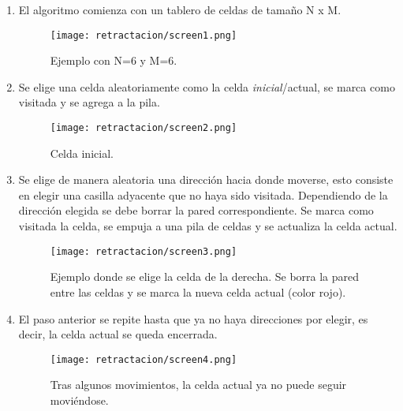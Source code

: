 \begin{enumerate}
  \item El algoritmo comienza con un tablero de celdas de tamaño N x M. 
    \begin{figure}[h!]
      \centering
      \texttt{[image: retractacion/screen1.png]}
      \caption{Ejemplo con N=6 y M=6.}
      \label{fig:tablero1}
    \end{figure}
    
  \item Se elige una celda aleatoriamente como la celda \textit{inicial}/actual, se marca como visitada y se agrega a la pila. 
    \begin{figure}[h!]
      \centering
      \texttt{[image: retractacion/screen2.png]}
      \caption{Celda inicial.}
      \label{fig:tablero2}
    \end{figure}
    
  \item Se elige de manera aleatoria una dirección hacia donde moverse, esto consiste en elegir una casilla adyacente que no haya sido visitada. Dependiendo de la dirección elegida se debe borrar la pared correspondiente. Se marca como visitada la celda, se empuja a una pila de celdas y se actualiza la celda actual. 
    \pagebreak
    \begin{figure}[h!]
      \centering
      \texttt{[image: retractacion/screen3.png]}
      \caption{Ejemplo donde se elige la celda de la derecha. Se borra la pared entre las celdas y se marca la nueva celda actual (color rojo).}
      \label{fig:tablero3}
    \end{figure}
    
  \item El paso anterior se repite hasta que ya no haya direcciones por elegir, es decir, la celda actual se queda encerrada. 
    \begin{figure}[h!]
      \centering
      \texttt{[image: retractacion/screen4.png]}
      \caption{Tras algunos movimientos, la celda actual ya no puede seguir moviéndose.}
      \label{fig:tablero4}
    \end{figure}
    

\end{enumerate}
